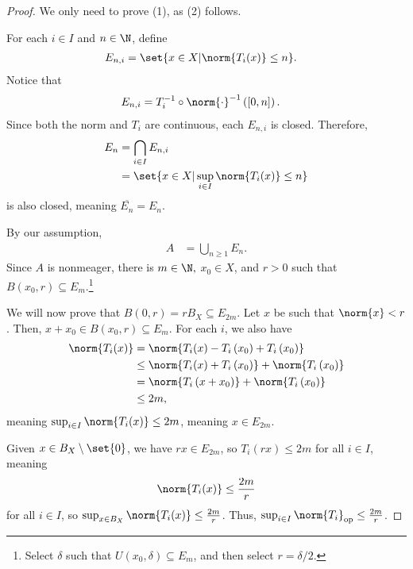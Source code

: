 \documentclass[10pt]{mypackage}
\begin{document}
  \begin{proof}
    We only need to prove (1), as (2) follows.\newline

    For each $i\in I$ and $n\in \N$, define
    \begin{align*}
      E_{n,i} &= \set{x\in X| \norm{T_i(x)} \leq n}.
    \end{align*}
    Notice that 
    \begin{align*}
      E_{n,i} &= T_i^{-1}\circ \norm{\cdot}^{-1}\left([0,n]\right).
    \end{align*}
    Since both the norm and $T_i$ are continuous, each $E_{n,i}$ is closed. Therefore,
    \begin{align*}
      E_{n} &= \bigcap_{i\in I}E_{n,i}\\
            &= \set{x\in X| \sup_{i\in I}\norm{T_i(x)} \leq n}
    \end{align*}
    is also closed, meaning $\overline{E_n} = E_n$.\newline

    By our assumption,
    \begin{align*}
      A &= \bigcup_{n\geq 1}E_n.
    \end{align*}
    Since $A$ is nonmeager, there is $m\in \N,$  $x_0\in X$, and $r > 0$ such that $B\left(x_0,r\right)\subseteq E_m$.\footnote{Select $\delta$ such that $U\left(x_0,\delta\right)\subseteq E_m$, and then select $r = \delta/2$.}\newline

    We will now prove that $B\left(0,r\right) = rB_{X}\subseteq E_{2m}$. Let $x$ be such that $\norm{x} < r$. Then, $x + x_0\in B\left(x_0,r\right) \subseteq E_m$. For each $i$, we also have
    \begin{align*}
      \norm{T_i(x)} &= \norm{T_i(x) - T_i\left(x_0\right) + T_i\left(x_0\right)}\\
                    &\leq \norm{T_i(x) + T_i\left(x_0\right)} + \norm{T_i\left(x_0\right)}\\
                    &= \norm{T_i\left(x + x_0\right)} + \norm{T_i\left(x_0\right)}\\
                    &\leq 2m,
    \end{align*}
    meaning $\sup_{i\in I}\norm{T_i(x)} \leq 2m$, meaning $x\in E_{2m}$.\newline

    Given $x\in B_X \setminus \set{0}$, we have $rx\in E_{2m}$, so $T_i\left(rx\right) \leq 2m$ for all $i\in I$, meaning
    \begin{align*}
      \norm{T_i(x)} \leq \frac{2m}{r}
    \end{align*}
    for all $i\in I$, so $\sup_{x\in B_X}\norm{T_i(x)}\leq \frac{2m}{r}$. Thus, $\sup_{i\in I}\norm{T_i}_{\text{op}} \leq \frac{2m}{r}$.
  \end{proof}
\end{document}
